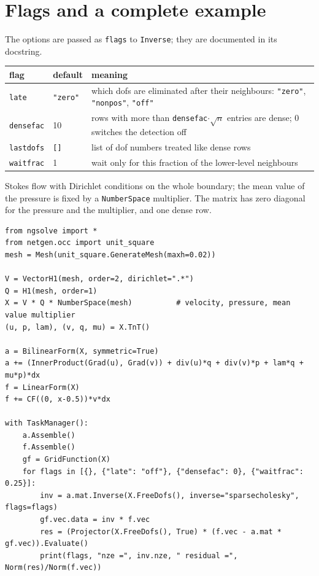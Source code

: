 \documentclass[10pt,a4paper]{article}
\newcommand{\code}[1]{\texttt{#1}}
\begin{document}
\section{Flags and a complete example}

The options are passed as \code{flags} to \code{Inverse}; they are documented in its docstring.
\begin{center}\small
\begin{tabular}{@{}lll@{}}\toprule
flag & default & meaning\\\midrule
\code{late} & \code{"zero"} & which dofs are eliminated after their neighbours: \code{"zero"}, \code{"nonpos"}, \code{"off"}\\
\code{densefac} & 10 & rows with more than \code{densefac}$\cdot\sqrt n$ entries are dense; 0 switches the detection off\\
\code{lastdofs} & \code{[]} & list of dof numbers treated like dense rows\\
\code{waitfrac} & 1 & wait only for this fraction of the lower-level neighbours\\\bottomrule
\end{tabular}
\end{center}

Stokes flow with Dirichlet conditions on the whole boundary; the mean value of the pressure is fixed by a \code{NumberSpace} multiplier. The matrix has zero diagonal for the pressure and the multiplier, and one dense row.

\begin{lstlisting}
from ngsolve import *
from netgen.occ import unit_square
mesh = Mesh(unit_square.GenerateMesh(maxh=0.02))

V = VectorH1(mesh, order=2, dirichlet=".*")
Q = H1(mesh, order=1)
X = V * Q * NumberSpace(mesh)          # velocity, pressure, mean value multiplier
(u, p, lam), (v, q, mu) = X.TnT()

a = BilinearForm(X, symmetric=True)
a += (InnerProduct(Grad(u), Grad(v)) + div(u)*q + div(v)*p + lam*q + mu*p)*dx
f = LinearForm(X)
f += CF((0, x-0.5))*v*dx

with TaskManager():
    a.Assemble()
    f.Assemble()
    gf = GridFunction(X)
    for flags in [{}, {"late": "off"}, {"densefac": 0}, {"waitfrac": 0.25}]:
        inv = a.mat.Inverse(X.FreeDofs(), inverse="sparsecholesky", flags=flags)
        gf.vec.data = inv * f.vec
        res = (Projector(X.FreeDofs(), True) * (f.vec - a.mat * gf.vec)).Evaluate()
        print(flags, "nze =", inv.nze, " residual =", Norm(res)/Norm(f.vec))
\end{lstlisting}
\end{document}
